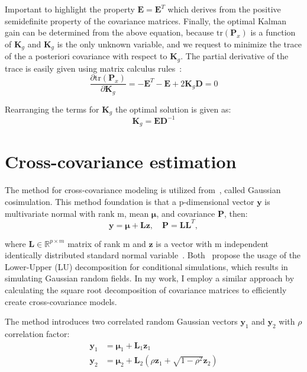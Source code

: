 Important to highlight the property $\mathbf{E}=\mathbf{E}^T$ which derives from the positive semidefinite property of the covariance matrices. Finally, the optimal Kalman gain can be determined from the above equation, because $\mathrm{tr}(\mathbf{P}_x)$ is a function of $\mathbf{K}_g$ and $\mathbf{K}_g$ is the only unknown variable, and we request to minimize the trace of the a posteriori covariance with respect to $\mathbf{K}_g$. The partial derivative of the trace is easily given using matrix calculus rules~\cite{matrix-calculus}:
\begin{equation}
    \frac{\partial \mathrm{tr}(\mathbf{P}_{x})}{\partial\mathbf{K}_g} = -\mathbf{E}^T-\mathbf{E}+2\mathbf{K}_g\mathbf{D} = 0
\end{equation}

Rearranging the terms for $\mathbf{K}_g$ the optimal solution is given as:
\begin{equation}
    \mathbf{K}_g=\mathbf{E}\mathbf{D}^{-1}
\label{eq:optimal-kalman-gain}
\end{equation}

\section{Cross-covariance estimation}

The method for cross-covariance modeling is utilized from~\cite{oliver2003gaussian}, called Gaussian cosimulation. This method foundation is that a p-dimensional vector $\mathbf{y}$ is multivariate normal with rank m, mean $\boldsymbol{\mu}$, and covariance $\mathbf{P}$, then:
\begin{equation}
    \mathbf{y}=\boldsymbol{\mu} + \mathbf{L}\mathbf{z}, \quad \mathbf{P}=\mathbf{L}\mathbf{L}^T,
\end{equation}

where $\mathbf{L}\in\mathbb{R}^{p\times m}$ matrix of rank m and $\mathbf{z}$ is a vector with m independent identically distributed standard normal variable~\cite{rao}. Both~\cite{Alabert1987, Davis1987} propose the usage of the Lower-Upper (LU) decomposition for conditional simulations, which results in simulating Gaussian random fields. In my work, I employ a similar approach by calculating the square root decomposition of covariance matrices to efficiently create cross-covariance models.

The method introduces two correlated random Gaussian vectors $\mathbf{y}_1$ and $\mathbf{y}_2$ with $\rho$ correlation factor:
\begin{equation}
\begin{aligned}
    \mathbf{y}_1 &= \boldsymbol{\mu}_1+\mathbf{L}_1\mathbf{z}_1 \\
    \mathbf{y}_2 &= \boldsymbol{\mu}_2+\mathbf{L}_2\left(\rho\mathbf{z}_1+\sqrt{1-\rho^2}\mathbf{z}_2\right)
\end{aligned}
\end{equation}


